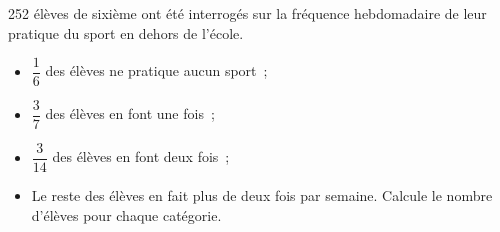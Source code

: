 \begin{exercice}
252 élèves de sixième ont été interrogés sur la fréquence hebdomadaire de leur pratique du sport en dehors de l'école. \\[0.2em]
\begin{itemize}
 \item $\dfrac{1}{6}$ des élèves ne pratique aucun sport ;
 \vspace{0.2cm}
 \item $\dfrac{3}{7}$ des élèves en font une fois ;
 \vspace{0.2cm}
 \item $\dfrac{3}{14}$ des élèves en font deux fois ;
 \vspace{0.2cm}
 \item Le reste des élèves en fait plus de deux fois par semaine. Calcule le nombre d'élèves pour chaque catégorie.
 \end{itemize}
\end{exercice}






